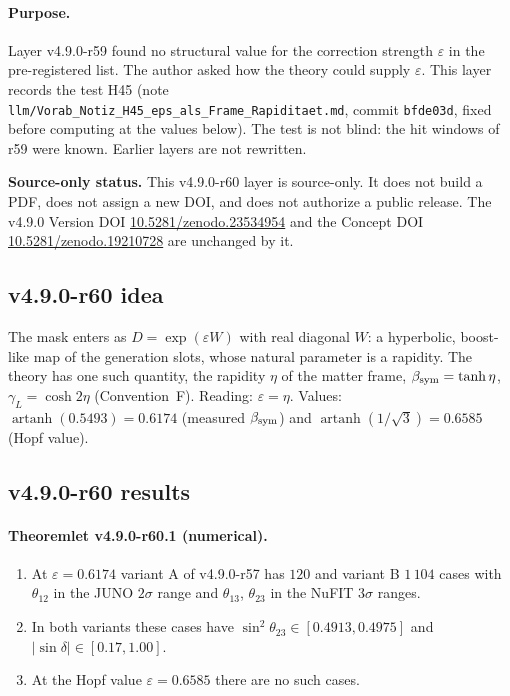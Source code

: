 \paragraph{Purpose.}
Layer v4.9.0-r59 found no structural value for the correction strength \(\varepsilon\) in the pre-registered list.  The author asked how the theory could supply
\(\varepsilon\).  This layer records the test H45 (note \texttt{llm/Vorab\_Notiz\_H45\_eps\_als\_Frame\_Rapiditaet.md}, commit \texttt{bfde03d}, fixed before computing at
the values below).  The test is not blind: the hit windows of r59 were known.  Earlier layers are not rewritten.

\noindent\textbf{Source-only status.}
This v4.9.0-r60 layer is source-only.  It does not build a PDF, does not assign a new DOI,
and does not authorize a public release.  The v4.9.0 Version DOI
\href{https://doi.org/10.5281/zenodo.23534954}{10.5281/zenodo.23534954} and the Concept DOI
\href{https://doi.org/10.5281/zenodo.19210728}{10.5281/zenodo.19210728} are unchanged by it.

\subsection*{v4.9.0-r60 idea}
\label{subsec:v490-r60-idea}

The mask enters as \(D=\exp(\varepsilon W)\) with real diagonal \(W\): a hyperbolic, boost-like map of the generation slots, whose natural parameter is a rapidity.  The
theory has one such quantity, the rapidity \(\eta\) of the matter frame, \(\beta_{\rm sym}=\tanh\eta\), \(\gamma_L=\cosh2\eta\) (Convention~F).  Reading:
\(\varepsilon=\eta\).  Values: \(\operatorname{artanh}(0.5493)=0.6174\) (measured \(\beta_{\rm sym}\)) and \(\operatorname{artanh}(1/\sqrt3)=0.6585\) (Hopf value).

\subsection*{v4.9.0-r60 results}
\label{subsec:v490-r60-results}

\paragraph{Theoremlet v4.9.0-r60.1 (numerical).}
\begin{enumerate}[leftmargin=2em]
\item[(a)] At \(\varepsilon=0.6174\) variant A of v4.9.0-r57 has \(120\) and variant B \(1\,104\) cases with \(\theta_{12}\) in the JUNO \(2\sigma\) range and \(\theta_{13}\),
\(\theta_{23}\) in the NuFIT \(3\sigma\) ranges.
\item[(b)] In both variants these cases have \(\sin^2\theta_{23}\in[0.4913,0.4975]\) and \(|\sin\delta|\in[0.17,1.00]\).
\item[(c)] At the Hopf value \(\varepsilon=0.6585\) there are no such cases.
\end{enumerate}

